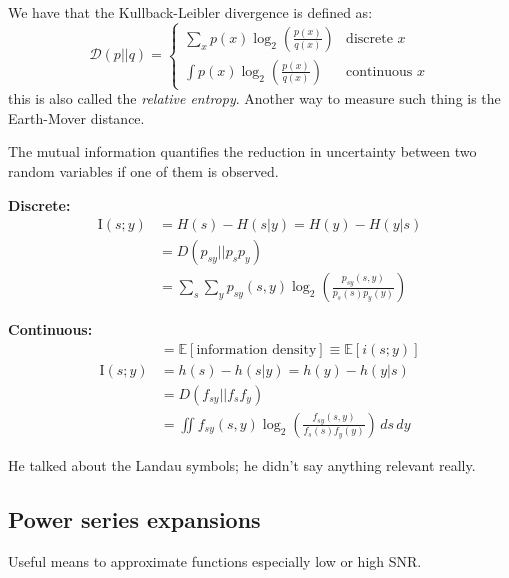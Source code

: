 \documentclass[a4paper, 12pt]{book}
\begin{document}
We have that the Kullback-Leibler divergence is defined as:
\begin{equation}
    \mathcal{D}(p||q) = 
    \begin{cases}
        \sum\limits_{x} p(x) \log_2 \left( \frac{p(x)}{q(x)} \right) & \text{discrete } x \\
        \int p(x) \log_2 \left( \frac{p(x)}{q(x)} \right) & \text{continuous } x
    \end{cases}
    \tag{1.34+1.36}
\end{equation}
this is also called the \textit{relative entropy}. Another way to measure such thing is the Earth-Mover distance.

\begin{center}
\end{center}

The mutual information quantifies the reduction in uncertainty between two random variables if one of them is observed.

\textbf{Discrete:}
\begin{align*}
    \text{I}(s;y) &= H(s) - H(s|y) = H(y) - H(y|s) \\
    &= D(p_{sy} || p_s p_y) \\
    &= \sum_s \sum_y p_{sy}(s,y) \log_2 \left( \frac{p_{sy}(s,y)}{p_s(s)p_y(y)} \right)
\end{align*}

\textbf{Continuous:}
\begin{align*}
    &= \mathbb{E}[\text{information density}] \equiv \mathbb{E}[i(s;y)] \\
    \text{I}(s;y) &= h(s) - h(s|y) = h(y) - h(y|s) \\
    &= D(f_{sy} || f_s f_y) \\
    &= \iint f_{sy}(s,y) \log_2 \left( \frac{f_{sy}(s,y)}{f_s(s)f_y(y)} \right) \, ds \, dy
\end{align*}

He talked about the \colorbox{cyan!30}{Landau symbols}; he didn't say anything relevant really.

\subsection{Power series expansions}
Useful means to approximate functions especially low or high SNR.
\end{document}
